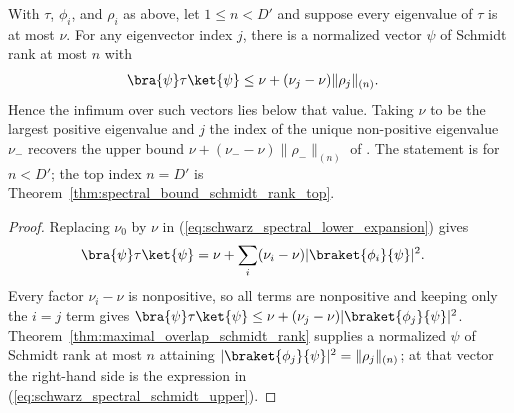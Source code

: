 \begin{theorem}
    \label{thm:spectral_upper_bound_schmidt_rank}
    \leanok
    With $\tau$, $\phi_i$, and $\rho_i$ as above, let $1\le n<D'$ and suppose
    every eigenvalue of $\tau$ is at most $\nu$. For any eigenvector index $j$,
    there is a normalized vector $\psi$ of Schmidt rank at most $n$ with
    \begin{align}
        \bra{\psi}\tau\ket{\psi}
         & \le\nu+(\nu_j-\nu)\|\rho_j\|_{(n)}.
        \label{eq:schwarz_spectral_schmidt_upper}
    \end{align}
    Hence the infimum over such vectors lies below that value. Taking $\nu$
    to be the largest positive eigenvalue and $j$ the index of the unique
    non-positive eigenvalue $\nu_-$ recovers the upper bound
    $\nu+(\nu_--\nu)\|\rho_-\|_{(n)}$ of
    \cite[Chapter~3, Proposition~3.2]{Wolf2012Quantum}. The statement is for
    $n<D'$; the top index $n=D'$ is
    Theorem~\ref{thm:spectral_bound_schmidt_rank_top}.
\end{theorem}

\begin{proof}
    \leanok
    Replacing $\nu_0$ by $\nu$ in
    (\ref{eq:schwarz_spectral_lower_expansion}) gives
    \begin{align}
        \bra{\psi}\tau\ket{\psi}
         & =\nu+\sum_i(\nu_i-\nu)|\braket{\phi_i}{\psi}|^2.
        \notag
    \end{align}
    Every factor $\nu_i-\nu$ is nonpositive, so all terms are nonpositive and
    keeping only the $i=j$ term gives
    $\bra{\psi}\tau\ket{\psi}
        \le\nu+(\nu_j-\nu)|\braket{\phi_j}{\psi}|^2$.
    Theorem~\ref{thm:maximal_overlap_schmidt_rank} supplies a normalized
    $\psi$ of Schmidt rank at most $n$ attaining
    $|\braket{\phi_j}{\psi}|^2=\|\rho_j\|_{(n)}$; at that vector the
    right-hand side is the expression in
    (\ref{eq:schwarz_spectral_schmidt_upper}).
\end{proof}

